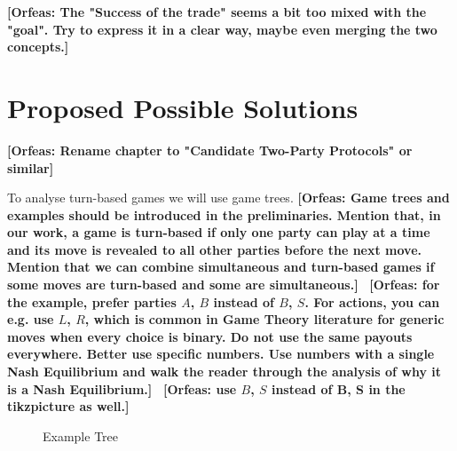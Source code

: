 \documentclass{cacthesis}
\newcommand{\authnote}[3]{{ \footnotesize \textbf{#1[#2: #3]~}}}
\newcommand{\orfnote}[1]{\authnote{\color{blue}}{Orfeas}{#1}}
\begin{document}
\orfnote{The "Success of the trade" seems a bit too mixed with the "goal". Try
to express it in a clear way, maybe even merging the two concepts.}


\chapter{Proposed Possible Solutions} \orfnote{Rename chapter to "Candidate
Two-Party Protocols" or similar}

To analyse turn-based games we will use game trees. \orfnote{Game trees and
examples should be introduced in the preliminaries. Mention that, in our work, a
game is turn-based if only one party can play at a time and its move is revealed
to all other parties before the next move. Mention that we can combine
simultaneous and turn-based games if some moves are turn-based and some are
simultaneous.}
 \orfnote{for the example, prefer parties $A$, $B$ instead
of $B$, $S$. For actions, you can e.g. use $L$, $R$, which is common in Game
Theory literature for generic moves when every choice is binary. Do not use the
same payouts everywhere. Better use specific numbers. Use numbers with a single
Nash Equilibrium and walk the reader through the analysis of why it is a Nash
Equilibrium.}
\orfnote{use $B$, $S$ instead of B, S in the tikzpicture as well.}
\begin{figure}[htb!]
    \centering
    \caption{Example Tree}
\end{figure}
\end{document}
